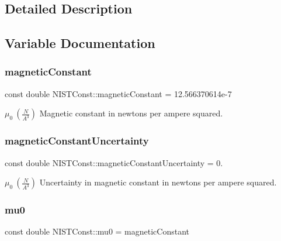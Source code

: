 \subsection{Detailed Description}


\subsection{Variable Documentation}
\mbox{\label{group___n_i_s_t_const-_magnetic_constant_ga511860d1f2830ae6a85e1b1df8522071}} 
\subsubsection{\texorpdfstring{magnetic\+Constant}{magneticConstant}}
{\footnotesize\ttfamily const double N\+I\+S\+T\+Const\+::magnetic\+Constant = 12.\+566370614e-\/7}

$\mu_0 \ (\frac{N}{A^3})$ Magnetic constant in newtons per ampere squared. \mbox{\label{group___n_i_s_t_const-_magnetic_constant_ga17f91f2aa414afe44a0bc84825034a4e}} 
\subsubsection{\texorpdfstring{magnetic\+Constant\+Uncertainty}{magneticConstantUncertainty}}
{\footnotesize\ttfamily const double N\+I\+S\+T\+Const\+::magnetic\+Constant\+Uncertainty = 0.}

$\mu_0 \ (\frac{N}{A^3})$ Uncertainty in magnetic constant in newtons per ampere squared. \mbox{\label{group___n_i_s_t_const-_magnetic_constant_gaee4806f14e9b0f48347b2d29ddcd2668}} 
\subsubsection{\texorpdfstring{mu0}{mu0}}
{\footnotesize\ttfamily const double N\+I\+S\+T\+Const\+::mu0 = magnetic\+Constant}

